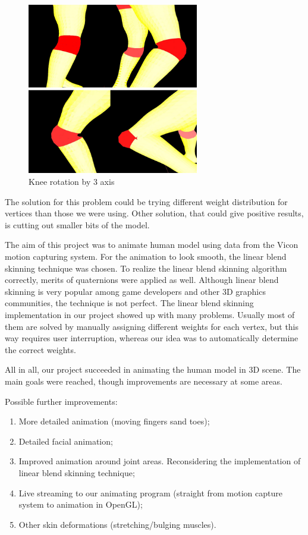 \documentclass[times, 10pt,twocolumn]{article}
\begin{document}
\begin{figure}[H]
  \caption{Knee rotation by 3 axis}
  \label{knee_3axis}
  \centering
  \includegraphics[width=75mm]{images/s_knee.jpg}
\end{figure}

The solution for this problem could be trying different weight distribution for vertices than those we were using.
Other solution, that could give positive results, is cutting out smaller bits of the model.


 The aim of this project was to animate human model using data from the Vicon motion capturing system. For the animation to look smooth, the linear blend skinning technique was chosen. To realize the linear blend skinning algorithm correctly, merits of quaternions were applied as well. Although linear blend skinning is very popular among game developers and other 3D graphics communities, the technique is not perfect. The linear blend skinning implementation in our project showed up with many problems. Usually most of them are solved by manually assigning different weights for each vertex, but this way requires user interruption, whereas our idea was to automatically determine the correct weights.

 All in all, our project succeeded in animating the human model in 3D scene. The main goals were reached, though improvements are necessary at some areas.

Possible further improvements:
\begin{enumerate}
    \item More detailed animation (moving fingers sand toes);
    \item Detailed facial animation;
    \item Improved animation around joint areas. Reconsidering the implementation of linear blend skinning technique;
    \item Live streaming to our animating program (straight from motion capture system to animation in OpenGL);
    \item Other skin deformations (stretching/bulging muscles).
\end{enumerate}
\end{document}
